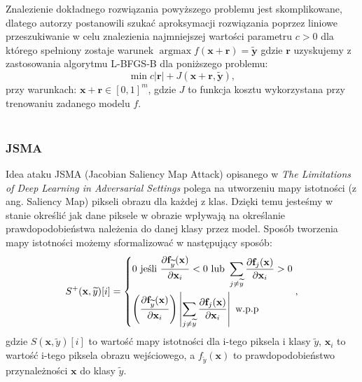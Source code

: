 \documentclass[
    left=2.5cm,         %
    right=2.5cm,        %
    top=2.5cm,          %
    bottom=3cm,         %
    bindingoffset=6mm,  %
    nohyphenation=false %
]{eiti/eiti-thesis}
\renewcommand{\vec}[1]{\mathbf{#1}}
\DeclareMathOperator{\argmax}{\operatorname*{argmax}} %
\begin{document}
Znalezienie dokładnego rozwiązania powyższego problemu jest skomplikowane, dlatego autorzy postanowili szukać aproksymacji
rozwiązania poprzez liniowe przeszukiwanie w celu znalezienia najmniejszej wartości parametru $c > 0$ dla którego spełniony
zostaje warunek $\argmax f(\vec{x}+\vec{r}) = \vec{\widetilde{y}}$ gdzie $\vec{r}$ uzyskujemy z zastosowania algorytmu L-BFGS-B dla poniższego problemu:
\begin{equation}\label{l-bfgs-b-equation}
    \min{c| \vec{r}| + J(\vec{x} + \vec{r}, \vec{\widetilde{y}})},
\end{equation}
 przy warunkach: $\vec{x}+\vec{r} \in [0,1]^{m}$, gdzie $J$ to funkcja kosztu wykorzystana przy trenowaniu zadanego modelu $f$.
\\~\\


\subsubsection{JSMA}
Idea ataku JSMA (Jacobian Saliency Map Attack) opisanego w
\textit{The Limitations of Deep Learning in Adversarial Settings}\cite{DBLP:journals/corr/PapernotMJFCS15}
polega na utworzeniu mapy istotności (z ang. Saliency Map) pikseli obrazu dla każdej z klas.
Dzięki temu jesteśmy w stanie określić jak dane piksele w obrazie wpływają na określanie prawdopodobieństwa należenia
do danej klasy przez model. Sposób tworzenia mapy istotności możemy sformalizować w następujący sposób:
\begin{equation}\label{jsma+}
S^{+} ( \vec{ x }, \widetilde{y} ) [ i ] = \begin{dcases}
    { 0 \text { jeśli } \frac { \partial \mathbf {f} _ { \widetilde{y} } ( \mathbf {x} ) } { \partial \mathbf {x} _ { i } } < 0 \text { lub } \sum _ { j \neq \widetilde{y} } \frac { \partial \mathbf {f} _ { j } ( \mathbf {x} ) } { \partial \mathbf {x} _ { i } } > 0 } \\
    { \left( \frac { \partial \mathbf {f} _ { \widetilde{y} } ( \mathbf {x} ) } { \partial \mathbf {x} _ { i } } \right) \left| \sum _ { j \neq \widetilde{y} } \frac { \partial \mathbf {f} _ { j } ( \mathbf {x} ) } { \partial \mathbf {x} _ { i } } \right| \text { w.p.p } }
\end{dcases},
\end{equation}
gdzie \( S(\vec{x}, \widetilde{y})[i] \) to wartość mapy istotności dla i-tego piksela i klasy $\widetilde{y}$,
$\vec{x}_i$ to wartość i-tego piksela obrazu wejściowego, a
$f_{\widetilde{y}}(\vec{x})$ to prawdopodobieństwo przynależności $\vec{x}$ do klasy $\widetilde{y}$.
\end{document}
